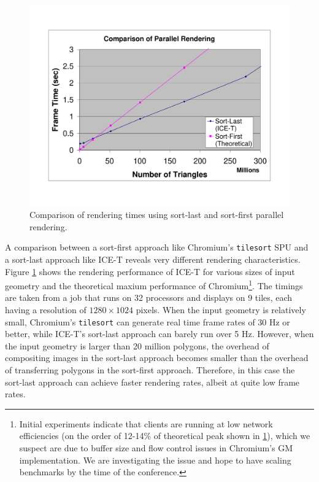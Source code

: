 \documentclass{acmsiggraph}
\newcommand{\cidentifier}[1]{\texttt{#1}}
\begin{document}
  \begin{figure}
    \includegraphics[width=\linewidth,bb=60 76 725 537]
		    {images/scaling}
    \caption{Comparison of rendering times using sort-last and sort-first
      parallel rendering.}
    \label{fig:scaling}
  \end{figure}

  A comparison between a sort-first approach like Chromium's
  \cidentifier{tile\-sort} SPU and a sort-last approach like ICE-T reveals
  very different rendering characteristics.  Figure \ref{fig:scaling} shows
  the rendering performance of ICE-T for various sizes of input geometry
  and the theoretical maxium performance of Chromium\footnote{Initial
  experiments indicate that clients are running at low network efficiencies
  (on the order of 12-14\% of theoretical peak shown in \ref{fig:scaling}),
  which we suspect are due to buffer size and flow control issues in
  Chromium's GM implementation. We are investigating the issue and hope to
  have scaling benchmarks by the time of the conference.}.  The timings are
  taken from a job that runs on 32 processors and displays on 9 tiles, each
  having a resolution of $1280 \times 1024$ pixels.  When the input
  geometry is relatively small, Chromium's \cidentifier{tile\-sort} can
  generate real time frame rates of 30 Hz or better, while ICE-T's
  sort-last approach can barely run over 5 Hz.  However, when the input
  geometry is larger than 20 million polygons, the overhead of compositing
  images in the sort-last approach becomes smaller than the overhead of
  transferring polygons in the sort-first approach.  Therefore, in this
  case the sort-last approach can achieve faster rendering rates, albeit at
  quite low frame rates.
\end{document}
